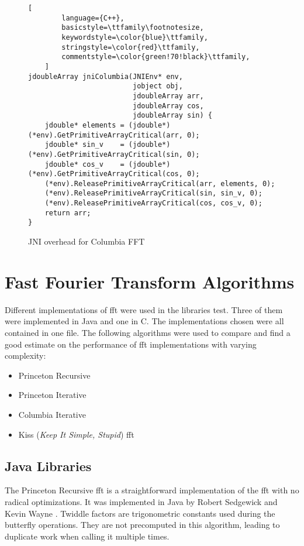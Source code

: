 \begin{figure}[H]
\begin{lstlisting}[
        language={C++},
        basicstyle=\ttfamily\footnotesize,
        keywordstyle=\color{blue}\ttfamily,
        stringstyle=\color{red}\ttfamily,
        commentstyle=\color{green!70!black}\ttfamily,
    ]
jdoubleArray jniColumbia(JNIEnv* env,
                         jobject obj,
                         jdoubleArray arr,
                         jdoubleArray cos,
                         jdoubleArray sin) {
    jdouble* elements = (jdouble*)(*env).GetPrimitiveArrayCritical(arr, 0);
    jdouble* sin_v    = (jdouble*)(*env).GetPrimitiveArrayCritical(sin, 0);
    jdouble* cos_v    = (jdouble*)(*env).GetPrimitiveArrayCritical(cos, 0);
    (*env).ReleasePrimitiveArrayCritical(arr, elements, 0);
    (*env).ReleasePrimitiveArrayCritical(sin, sin_v, 0);
    (*env).ReleasePrimitiveArrayCritical(cos, cos_v, 0);
    return arr;
}
\end{lstlisting}
\caption{JNI overhead for Columbia FFT}
\label{fig:jni:columbia}
\end{figure}

\section{Fast Fourier Transform Algorithms}
Different implementations of \gls{fft} were used in the libraries test. Three of them were implemented in Java and one in C. The implementations chosen were all contained in one file. The following algorithms were used to compare and find a good estimate on the performance of \gls{fft} implementations with varying complexity:

\begin{itemize}
    \item Princeton Recursive \cite{princeton:recursive}
    \item Princeton Iterative \cite{princeton:iterative}
    \item Columbia Iterative \cite{columbia:iterative}
    \item Kiss (\emph{Keep It Simple, Stupid}) \gls{fft} \cite{kiss:fft}
\end{itemize}

\subsection{Java Libraries}

The Princeton Recursive \gls{fft} is a straightforward implementation of the \gls{fft} with no radical optimizations. It was implemented in Java by Robert Sedgewick and Kevin Wayne \cite{princeton:recursive}. Twiddle factors are trigonometric constants used during the butterfly operations. They are not precomputed in this algorithm, leading to duplicate work when calling it multiple times.

